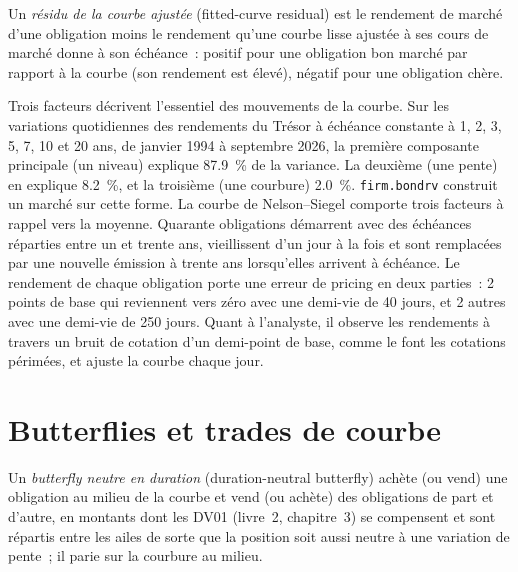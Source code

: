 \begin{definition}\label{def:s2:government-bond-relative-value:residual}
Un \emph{résidu de la courbe ajustée} (fitted-curve residual) est le rendement de marché d'une obligation moins le rendement qu'une courbe lisse ajustée à ses cours de marché donne à son
échéance~: positif pour une obligation bon marché par rapport à la courbe (son rendement est élevé), négatif pour une obligation chère.
\end{definition}

Trois facteurs décrivent l'essentiel des mouvements de la courbe. Sur les variations quotidiennes des rendements du Trésor à échéance constante à 1, 2, 3, 5, 7, 10 et 20 ans, de
janvier 1994 à septembre 2026, la première composante principale (un niveau) explique 87.9~\% de la variance. La deuxième (une pente) en explique 8.2~\%, et la
troisième (une courbure) 2.0~\%. \texttt{firm.bondrv} construit un marché sur cette forme. La courbe de Nelson--Siegel comporte trois facteurs à rappel vers la moyenne. Quarante obligations
démarrent avec des échéances réparties entre un et trente ans, vieillissent d'un jour à la fois et sont remplacées par une nouvelle émission à trente ans lorsqu'elles arrivent à échéance. Le
rendement de chaque obligation porte une erreur de pricing en deux parties~: 2 points de base qui reviennent vers zéro avec une demi-vie de 40 jours, et 2 autres avec une demi-vie de 250 jours. Quant
à l'analyste, il observe les rendements à travers un bruit de cotation d'un demi-point de base, comme le font les cotations périmées, et ajuste la courbe chaque jour.

\section{Butterflies et trades de courbe}

\begin{definition}\label{def:s2:government-bond-relative-value:fly}
Un \emph{butterfly neutre en duration} (duration-neutral butterfly) achète (ou vend) une obligation au milieu de la courbe et vend (ou achète) des obligations de
part et d'autre, en montants dont les DV01 (livre~2, chapitre~3) se compensent et sont répartis entre les ailes de sorte que la position soit aussi neutre à une
variation de pente~; il parie sur la courbure au milieu.
\end{definition}

